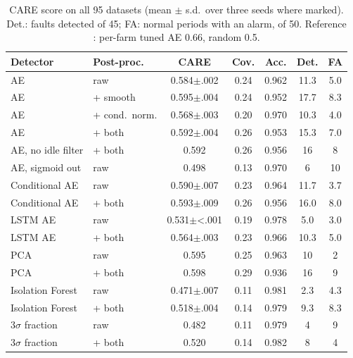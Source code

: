 \documentclass[conference]{IEEEtran}
\begin{document}
\begin{table}[t]
\caption{CARE score on all 95 datasets (mean $\pm$ s.d.\ over three seeds where marked). Det.: faults detected of 45; FA: normal periods with an alarm, of 50. Reference \cite{r12}: per-farm tuned AE 0.66, random 0.5.}
\label{tab:care}
\centering
\setlength{\tabcolsep}{2.4pt}
\begin{tabular}{llccccc}
\toprule
Detector & Post-proc. & CARE & Cov. & Acc. & Det. & FA\\
\midrule
AE & raw & 0.584$\pm$.002 & 0.24 & 0.962 & 11.3 & 5.0\\
AE & + smooth & 0.595$\pm$.004 & 0.24 & 0.952 & 17.7 & 8.3\\
AE & + cond.\ norm. & 0.568$\pm$.003 & 0.20 & 0.970 & 10.3 & 4.0\\
AE & + both & 0.592$\pm$.004 & 0.26 & 0.953 & 15.3 & 7.0\\
AE, no idle filter & + both & 0.592 & 0.26 & 0.956 & 16 & 8\\
AE, sigmoid out & raw & 0.498 & 0.13 & 0.970 & 6 & 10\\
Conditional AE & raw & 0.590$\pm$.007 & 0.23 & 0.964 & 11.7 & 3.7\\
Conditional AE & + both & 0.593$\pm$.009 & 0.26 & 0.956 & 16.0 & 8.0\\
LSTM AE & raw & 0.531$\pm$<.001 & 0.19 & 0.978 & 5.0 & 3.0\\
LSTM AE & + both & 0.564$\pm$.003 & 0.23 & 0.966 & 10.3 & 5.0\\
PCA & raw & 0.595 & 0.25 & 0.963 & 10 & 2\\
PCA & + both & 0.598 & 0.29 & 0.936 & 16 & 9\\
Isolation Forest & raw & 0.471$\pm$.007 & 0.11 & 0.981 & 2.3 & 4.3\\
Isolation Forest & + both & 0.518$\pm$.004 & 0.14 & 0.979 & 9.3 & 8.3\\
3$\sigma$ fraction & raw & 0.482 & 0.11 & 0.979 & 4 & 9\\
3$\sigma$ fraction & + both & 0.520 & 0.14 & 0.982 & 8 & 4\\
\bottomrule
\end{tabular}
\end{table}
\end{document}
